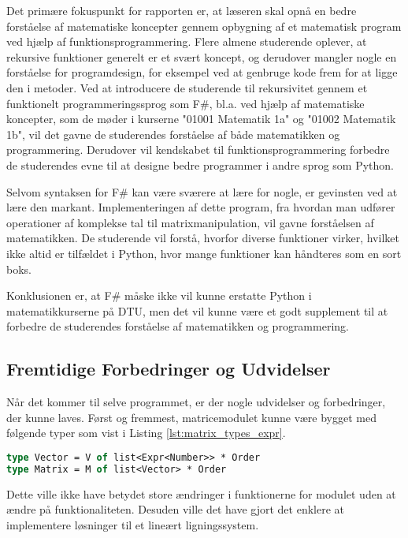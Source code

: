 Det primære fokuspunkt for rapporten er, at læseren skal opnå en bedre forståelse af matematiske koncepter gennem opbygning af et matematisk program ved hjælp af funktionsprogrammering. Flere almene studerende oplever, at rekursive funktioner generelt er et svært koncept, og derudover mangler nogle en forståelse for programdesign, for eksempel ved at genbruge kode frem for at ligge den i metoder. Ved at introducere de studerende til rekursivitet gennem et funktionelt programmeringssprog som F\#, bl.a. ved hjælp af matematiske koncepter, som de møder i kurserne "01001 Matematik 1a" og "01002 Matematik 1b", vil det gavne de studerendes forståelse af både matematikken og programmering. Derudover vil kendskabet til funktionsprogrammering forbedre de studerendes evne til at designe bedre programmer i andre sprog som Python.

Selvom syntaksen for F\# kan være sværere at lære for nogle, er gevinsten ved at lære den markant. Implementeringen af dette program, fra hvordan man udfører operationer af komplekse tal til matrixmanipulation, vil gavne forståelsen af matematikken. De studerende vil forstå, hvorfor diverse funktioner virker, hvilket ikke altid er tilfældet i Python, hvor mange funktioner kan håndteres som en sort boks.

Konklusionen er, at F\# måske ikke vil kunne erstatte Python i matematikkurserne på DTU, men det vil kunne være et godt supplement til at forbedre de studerendes forståelse af matematikken og programmering.


\subsection{Fremtidige Forbedringer og Udvidelser}
Når det kommer til selve programmet, er der nogle udvidelser og forbedringer, der kunne laves. Først og fremmest, matricemodulet kunne være bygget med følgende typer som vist i Listing \ref{lst:matrix_types_expr}.

\begin{lstlisting}[language={FSharp}, label={lst:matrix_types_expr}, caption={Eksempel på alternative typer for matrixmodulet}]
type Vector = V of list<Expr<Number>> * Order
type Matrix = M of list<Vector> * Order
\end{lstlisting}

Dette ville ikke have betydet store ændringer i funktionerne for modulet uden at ændre på funktionaliteten. Desuden ville det have gjort det enklere at implementere løsninger til et lineært ligningssystem.


